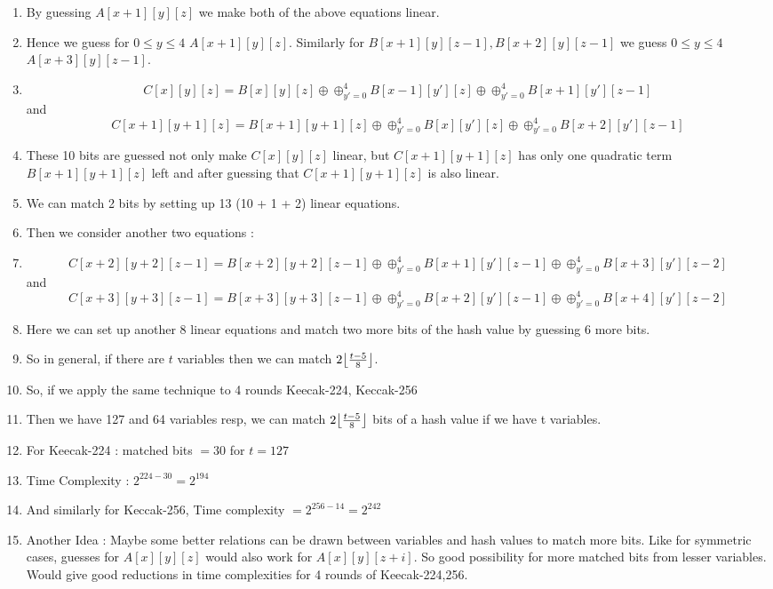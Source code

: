 \documentclass{article}
\DeclarePairedDelimiter\floor{\lfloor}{\rfloor}
\begin{document}
\begin{enumerate}
	\item By guessing $A[x+1][y][z]$ we make both of the above equations linear.
	
	\item Hence we guess for $0 \leq y \leq 4$ $A[x+1][y][z]$. Similarly for $B[x+1][y][z-1], B[x+2][y][z-1]$ we guess $0 \leq y \leq 4$ $A[x+3][y][z-1]$. 
	\item 
		\[
        C[x][y][z] = B[x][y][z] \oplus \oplus_{y' = 0}^{4} B[x-1][y'][z] \oplus \oplus_{y' = 0}^{4} B[x+1][y'][z-1]
    \] and 
		\[
        C[x+1][y+1][z] = B[x+1][y+1][z] \oplus \oplus_{y' = 0}^{4} B[x][y'][z] \oplus \oplus_{y' = 0}^{4} B[x+2][y'][z-1]
    \]

    \item These 10 bits are guessed not only make $C[x][y][z]$ linear, but $C[x+1][y+1][z]$ has only one quadratic term $B[x+1][y+1][z]$ left and after guessing that $C[x+1][y+1][z]$ is also linear. 
    
    \item We can match 2 bits by setting up 13 (10 + 1 + 2) linear equations. 
    
    \item Then we consider another two equations :
    
    \item 	\[
        C[x + 2][y+2][z-1] = B[x + 2][y+2][z-1] \oplus \oplus_{y' = 0}^{4} B[x+1][y'][z-1] \oplus \oplus_{y' = 0}^{4} B[x+3][y'][z-2]
    \] and 
		\[
        C[x+3][y+3][z-1] = B[x+3][y+3][z-1] \oplus \oplus_{y' = 0}^{4} B[x+2][y'][z-1] \oplus \oplus_{y' = 0}^{4} B[x+4][y'][z-2]
    \]
    
    \item Here we can set up another 8 linear equations and match two more bits of the hash value by guessing 6 more bits.
    
    \item So in general, if there are $t$ variables then we can match $2\floor*{\frac{t-5}{8}}$.
    
    \item So, if we apply the same technique to 4 rounds Keecak-224, Keccak-256
    \item Then we have 127 and 64 variables resp, we can match $2\floor*{\frac{t-5}{8}}$ bits of a hash value if we have t variables.
    \item For Keecak-224 : matched bits $= 30$ for $t = 127$
    \item Time Complexity : $2^{224 - 30} = 2^{194}$
    \item And similarly for Keccak-256, Time complexity $=2^{256 - 14} = 2^{242}$
    \item Another Idea : Maybe some better relations can be drawn between variables and hash values to match more bits. Like for symmetric cases, guesses for $A[x][y][z]$ would also work for $A[x][y][z + i]$. So good possibility for more matched bits from lesser variables. Would give good reductions in time complexities for 4 rounds of Keecak-224,256.
\end{enumerate}
\end{document}
